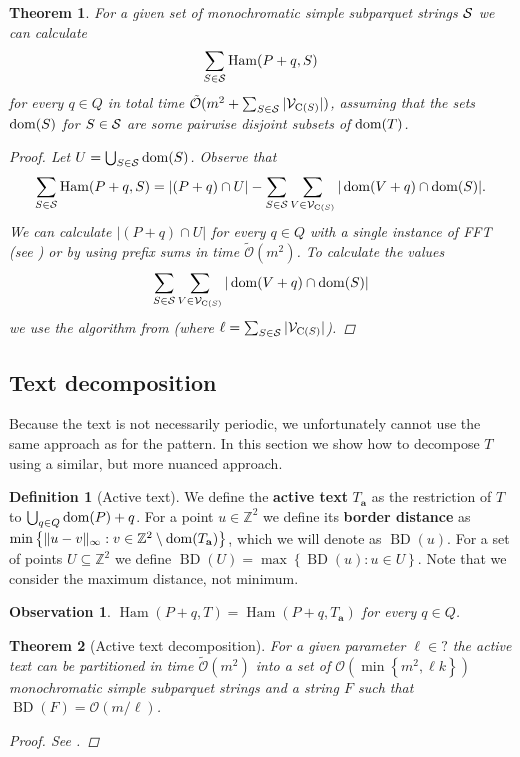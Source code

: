 \documentclass[11pt]{article}
\newcommand{\Z}{\mathbb{Z}}
\renewcommand{\O}{\mathcal{O}}
\newcommand{\tO}{\tilde{\mathcal{O}}}
\newcommand{\set}[1]{\left\lbrace #1 \right\rbrace}
\theoremstyle{plain}
\newtheorem{theorem}{Theorem}
\newtheorem{observation}{Observation}
\theoremstyle{definition}
\newtheorem{definition}{Definition}
\theoremstyle{remark}
\DeclareMathOperator*{\Ham}{Ham}
\DeclareMathOperator*{\BD}{BD}
\begin{document}
\begin{theorem}\label{sparse_algo}
	For a given set of monochromatic simple subparquet strings $\S$ we can calculate
	$$ \sum_{S \in \S} \Ham(P + q, S) $$
	for every $q \in Q$ in total time $\tO(m^2 + \sum_{S \in \S} |\V_{\getchar{S}}|)$, assuming that the sets $\d{S}$ for $S \in \S$ are some pairwise disjoint subsets of $\d{T}$.
	\begin{proof}
		Let $U = \bigcup_{S \in \S} \d{S}$. Observe that
		$$ \sum_{S \in \S} \Ham(P + q, S) = |(P + q) \cap U| - \sum_{S \in \S}\sum_{V \in \V_{\getchar{S}}} |\d{V + q} \cap \d{S}|.$$
		We can calculate $|(P + q) \cap U|$ for every $q \in Q$ with a single instance of FFT (see ) or by using prefix sums in time $\tO(m^2)$.
		To calculate the values
		$$ \sum_{S \in \S}\sum_{V \in \V_{\getchar{S}}} |\d{V + q} \cap \d{S}| $$
		we use the algorithm from  (where $\ell = \sum_{S \in \S} |\V_{\getchar{S}}|$).
	\end{proof}
\end{theorem}

\subsection{Text decomposition}
Because the text is not necessarily periodic, we unfortunately cannot use the same approach as for the pattern.
In this section we show how to decompose $T$ using a similar, but more nuanced approach.


\newcommand{\Ta}{T_\mathbf{a}}
\begin{definition}[Active text]
	We define the \textbf{active text} $\Ta$ as the restriction of $T$ to $\bigcup_{q \in Q} \d{P} + q$.
	For a point $u \in \Z^2$ we define its \textbf{border distance} as
	$\min\set{\|u - v\|_\infty : v \in \Z^2 \setminus \d{\Ta}} $,
	which we will denote as $\BD(u)$.
	For a set of points $U \subseteq \Z^2$ we define $\BD(U) = \max\set{\BD(u) : u \in U}$.
	Note that we consider the maximum distance, not minimum.
\end{definition}


\begin{observation}
	$\Ham(P + q, T) = \Ham(P + q, \Ta)$ for every $q \in Q$.
\end{observation}


\begin{theorem}[Active text decomposition]\label{text_decomposition}
	For a given parameter $\ell \in ?$ the active text can be partitioned in time $\tO(m^2)$ into a set of $\O(\min\set{m^2, \ell k})$ monochromatic simple subparquet strings
	and a string $F$ such that $\BD(F) = \O(m / \ell)$.
	\begin{proof} See . \end{proof}
\end{theorem}
\end{document}
